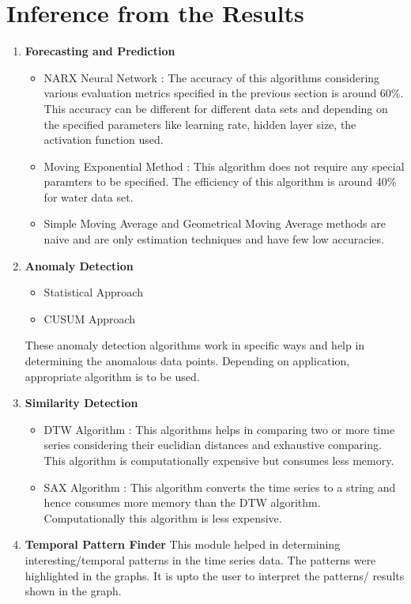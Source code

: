 \documentclass[12pt]{report}
\begin{document}
\section{Inference from the Results}
\begin{enumerate}

\item \textbf{Forecasting and Prediction}
\begin{itemize}
\item  NARX Neural Network : The accuracy of this algorithms considering various evaluation metrics specified in the previous section is around 60\%. This accuracy can be different for different data sets and depending on the specified parameters like learning rate, hidden layer size, the activation function used.
\item  Moving Exponential Method :  This algorithm does not require any special paramters to be specified. The efficiency of this algorithm is around 40\% for water data set.
\item Simple Moving Average and Geometrical Moving Average methods are naive and are only estimation techniques and have few low accuracies.
\end{itemize}

\item \textbf{Anomaly Detection }

\begin{itemize}
\item  Statistical Approach 
\item  CUSUM Approach 
\end{itemize}
These anomaly detection algorithms work in specific ways and help in determining the anomalous data points. Depending on application, appropriate algorithm is to be used.
\item \textbf{Similarity Detection }
\begin{itemize}
\item  DTW Algorithm : This algorithms helps in comparing two or more time series considering their euclidian distances and exhaustive comparing. This algorithm is computationally expensive but consumes less memory.
\item  SAX Algorithm : This algorithm converts the time series to a string and hence consumes more memory than the DTW algorithm. Computationally this algorithm is less expensive.
\end{itemize}

\item \textbf{Temporal Pattern Finder}
This module helped in determining interesting/temporal patterns in the time series data. The patterns were highlighted in the graphs. It is upto the user to interpret the patterns/ results shown in the graph.

\end{enumerate}
\end{document}
